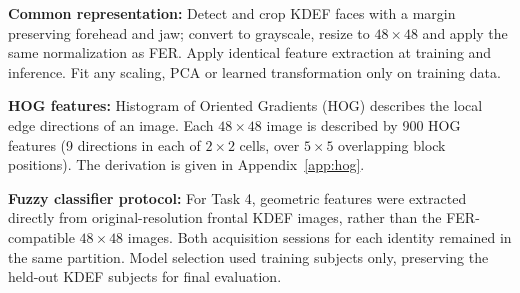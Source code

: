 \textbf{Common representation:} Detect and crop KDEF faces with a margin preserving forehead and jaw; convert to grayscale, resize to $48\times48$ and apply the same normalization as FER. Apply identical feature extraction at training and inference. Fit any scaling, PCA or learned transformation only on training data.

\textbf{HOG features:} Histogram of Oriented Gradients (HOG) describes the local edge directions of an image. Each $48\times48$ image is described by 900 HOG features (9 directions in each of $2\times2$ cells, over $5\times5$ overlapping block positions). The derivation is given in Appendix~\ref{app:hog}.

\textbf{Fuzzy classifier protocol:}
For Task 4, geometric features were extracted directly from original-resolution frontal KDEF images, rather than the FER-compatible $48\times48$ images. Both acquisition sessions for each identity remained in the same partition. Model selection used training subjects only, preserving the held-out KDEF subjects for final evaluation.
